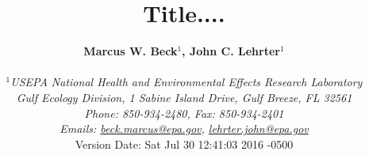 \documentclass[letterpaper,12pt,oneside]{article}\usepackage[]{graphicx}\usepackage[]{color}
\begin{document}
\raggedbottom
\linenumbers
\raggedright
{}
\setlength{\parindent}{0.5in}
\renewcommand\refname{References \vspace{12pt}}

\begin{singlespace}
\title{{\bf {\Large Title....}}}
\author{
  {\bf {\normalsize Marcus W. Beck$^1$, John C. Lehrter$^1$}}
  \\\\{\textit {\normalsize $^1$USEPA National Health and Environmental Effects Research Laboratory}}
  \\{\textit {\normalsize Gulf Ecology Division, 1 Sabine Island Drive, Gulf Breeze, FL 32561}}
	\\{\textit {\normalsize Phone: 850-934-2480, Fax: 850-934-2401}}
	\\{\textit {\normalsize Emails: \href{mailto:beck.marcus@epa.gov}{beck.marcus@epa.gov}, \href{mailto:lehrter.john@epa.gov}{lehrter.john@epa.gov}}}
  \vspace{1in} 
  \\ Version Date:   Sat Jul 30 12:41:03 2016 -0500
	}
\date{}
\maketitle
\end{singlespace}
\clearpage
\end{document}
